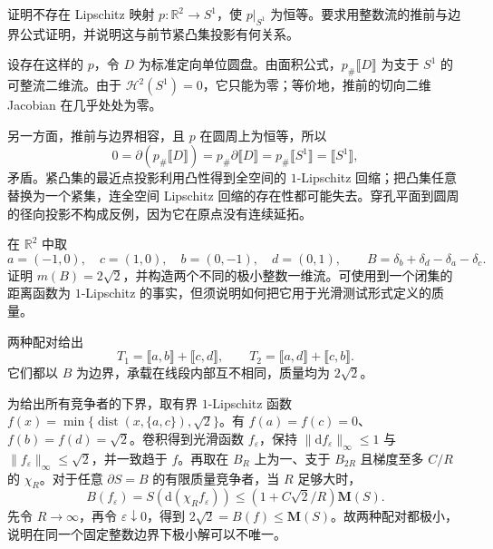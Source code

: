 \begin{exercise}\label{g3:ex:no-lipschitz-retraction-circle}
	证明不存在 Lipschitz 映射 \(p:\mathbb R^2\to S^1\)，使 \(p|_{S^1}\) 为恒等。要求用整数流的推前与边界公式证明，并说明这与前节紧凸集投影有何关系。
\end{exercise}
\begin{solution}
	设存在这样的 \(p\)，令 \(D\) 为标准定向单位圆盘。由面积公式，\(p_\#\lBrack D\rBrack\) 为支于 \(S^1\) 的可整流二维流。由于 \(\mathcal H^2(S^1)=0\)，它只能为零；等价地，推前的切向二维 Jacobian 在几乎处处为零。

	另一方面，推前与边界相容，且 \(p\) 在圆周上为恒等，所以
	\[
		0=\partial(p_\#\lBrack D\rBrack)
		=p_\#\partial\lBrack D\rBrack
		=p_\#\lBrack S^1\rBrack=\lBrack S^1\rBrack,
	\]
	矛盾。紧凸集的最近点投影利用凸性得到全空间的 \(1\)-Lipschitz 回缩；把凸集任意替换为一个紧集，连全空间 Lipschitz 回缩的存在性都可能失去。穿孔平面到圆周的径向投影不构成反例，因为它在原点没有连续延拓。
\end{solution}

\begin{exercise}\label{g3:ex:plateau-nonunique-four-points}
	在 \(\mathbb R^2\) 中取
	\[
		a=(-1,0),\quad c=(1,0),\quad b=(0,-1),\quad d=(0,1),
		\qquad B=\delta_b+\delta_d-\delta_a-\delta_c.
	\]
	证明 \(m(B)=2\sqrt2\)，并构造两个不同的极小整数一维流。可使用到一个闭集的距离函数为 \(1\)-Lipschitz 的事实，但须说明如何把它用于光滑测试形式定义的质量。
\end{exercise}
\begin{solution}
	两种配对给出
	\[
		T_1=\lBrack a,b\rBrack+\lBrack c,d\rBrack,
		\qquad T_2=\lBrack a,d\rBrack+\lBrack c,b\rBrack.
	\]
	它们都以 \(B\) 为边界，承载在线段内部互不相同，质量均为 \(2\sqrt2\)。

	为给出所有竞争者的下界，取有界 \(1\)-Lipschitz 函数
	\(f(x)=\min\{\operatorname{dist}(x,\{a,c\}),\sqrt2\}\)。有 \(f(a)=f(c)=0\)、\(f(b)=f(d)=\sqrt2\)。卷积得到光滑函数 \(f_\varepsilon\)，保持 \(\|\mathrm df_\varepsilon\|_\infty\le1\) 与 \(\|f_\varepsilon\|_\infty\le\sqrt2\)，并一致趋于 \(f\)。再取在 \(B_R\) 上为一、支于 \(B_{2R}\) 且梯度至多 \(C/R\) 的 \(\chi_R\)。对于任意 \(\partial S=B\) 的有限质量竞争者，当 \(R\) 足够大时，
	\[
		B(f_\varepsilon)=S(\mathrm d(\chi_Rf_\varepsilon))
		\le(1+C\sqrt2/R)\mathbf M(S).
	\]
	先令 \(R\to\infty\)，再令 \(\varepsilon\downarrow0\)，得到
	\(2\sqrt2=B(f)\le\mathbf M(S)\)。故两种配对都极小，说明在同一个固定整数边界下极小解可以不唯一。
\end{solution}

